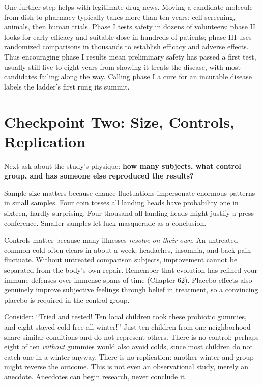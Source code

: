 One further step helps with legitimate drug news. Moving a candidate molecule from dish to pharmacy typically takes more than ten years: cell screening, animals, then human trials. Phase I tests safety in dozens of volunteers; phase II looks for early efficacy and suitable dose in hundreds of patients; phase III uses randomized comparisons in thousands to establish efficacy and adverse effects. Thus encouraging phase I results mean preliminary safety has passed a first test, usually still five to eight years from showing it treats the disease, with most candidates failing along the way. Calling phase I a cure for an incurable disease labels the ladder's first rung its summit.

\section{Checkpoint Two: Size, Controls, Replication}

Next ask about the study's physique: \textbf{how many subjects, what control group, and has someone else reproduced the results?}

Sample size matters because chance fluctuations impersonate enormous patterns in small samples. Four coin tosses all landing heads have probability one in sixteen, hardly surprising. Four thousand all landing heads might justify a press conference. Smaller samples let luck masquerade as a conclusion.

Controls matter because many illnesses \emph{resolve on their own}. An untreated common cold often clears in about a week; headaches, insomnia, and back pain fluctuate. Without untreated comparison subjects, improvement cannot be separated from the body's own repair. Remember that evolution has refined your immune defenses over immense spans of time (Chapter 62). Placebo effects also genuinely improve subjective feelings through belief in treatment, so a convincing placebo is required in the control group.

Consider: ``Tried and tested! Ten local children took these probiotic gummies, and eight stayed cold-free all winter!'' Just ten children from one neighborhood share similar conditions and do not represent others. There is no control: perhaps eight of ten \emph{without} gummies would also avoid colds, since most children do not catch one in a winter anyway. There is no replication: another winter and group might reverse the outcome. This is not even an observational study, merely an anecdote. Anecdotes can begin research, never conclude it.

